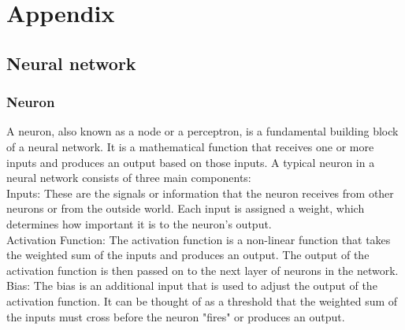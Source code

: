 \documentclass[a4paper]{sapthesis}
\begin{document}
\chapter{Appendix}
\section {Neural network}
\subsection{Neuron}\label{sec:neuron}
A neuron, also known as a node or a perceptron, is a fundamental building
 block of a neural network. It is a mathematical function that receives one
or more inputs and produces an output based on those inputs. \newline 
A typical neuron in a neural network consists of three main components:\newline \\
Inputs: These are the signals or information that the neuron receives from 
other neurons or from the outside world.
 Each input is assigned a weight, which determines how important it is 
 to the neuron's output. \newline \\
Activation Function: The activation function is a non-linear function 
that takes the weighted sum of the inputs and produces an output. 
The output of the activation function is then passed on to the next 
layer of neurons in the network.\newline \\
Bias: The bias is an additional input that is used to adjust the output 
of the activation function. It can be thought of as a threshold that the 
weighted sum of the inputs must cross before the neuron "fires" or 
produces an output.
\end{document}
